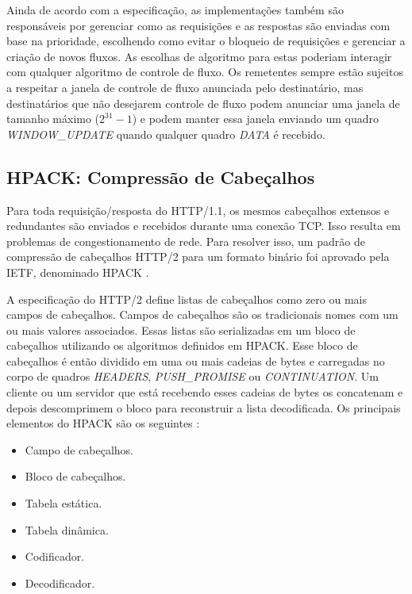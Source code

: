 Ainda de acordo com a especificação, as implementações também são responsáveis por gerenciar como as requisições e as respostas são enviadas com base na prioridade, escolhendo como evitar o bloqueio de requisições e gerenciar a criação de novos fluxos. As escolhas de algoritmo para estas poderiam interagir com qualquer algoritmo de controle de fluxo. Os remetentes sempre estão sujeitos a respeitar a janela de controle de fluxo anunciada pelo destinatário, mas destinatários que não desejarem controle de fluxo podem anunciar uma janela de tamanho máximo ($2^{31} - 1$) e podem manter essa janela enviando um quadro {\em WINDOW\_UPDATE} quando qualquer quadro {\em DATA} é recebido.

\subsection{HPACK: Compressão de Cabeçalhos}
\label{subsec:compression}

Para toda requisição\slash resposta do HTTP/1.1, os mesmos cabeçalhos extensos e redundantes são enviados e recebidos durante uma conexão TCP. Isso resulta em problemas de congestionamento de rede. Para resolver isso, um padrão de compressão de cabeçalhos HTTP/2 para um formato binário foi aprovado pela IETF, denominado HPACK \cite{BelsheRFC7541}.

A especificação do HTTP/2 define listas de cabeçalhos como zero ou mais campos de cabeçalhos. Campos de cabeçalhos são os tradicionais nomes com um ou mais valores associados. Essas listas são serializadas em um bloco de cabeçalhos utilizando os algoritmos definidos em HPACK. Esse bloco de cabeçalhos é então dividido em uma ou mais cadeias de bytes e carregadas no corpo de quadros {\em HEADERS}, {\em PUSH\_PROMISE} ou {\em CONTINUATION}. Um cliente ou um servidor que está recebendo esses cadeias de bytes os concatenam e depois descomprimem o bloco para reconstruir a lista decodificada.  Os principais elementos do HPACK são os seguintes \cite{Yamamoto:2017:EHH:3095786.3095787}:

\begin{itemize}
    \item Campo de cabeçalhos.
    \item Bloco de cabeçalhos.
    \item Tabela estática.
    \item Tabela dinâmica.
    \item Codificador.
    \item Decodificador.
\end{itemize}

